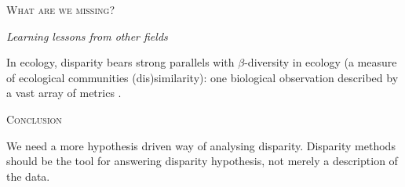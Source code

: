 \documentclass[12pt,letterpaper]{article}
\renewcommand{\section}[1]{%
\bigskip
\begin{center}
\begin{Large}
\normalfont\scshape #1
\medskip
\end{Large}
\end{center}}
\renewcommand{\subsection}[1]{%
\bigskip
\begin{center}
\begin{large}
\normalfont\itshape #1
\end{large}
\end{center}}
\begin{document}
\section{What are we missing?}

\subsection{Learning lessons from other fields}
In ecology, disparity bears strong parallels with $\beta$-diversity in ecology (a measure of ecological communities (dis)similarity): one biological observation described by a vast array of metrics \citep{baselga2010partitioning, anderson2011navigating, donohue2016navigating}.

\section{Conclusion}
We need a more hypothesis driven way of analysing disparity.
Disparity methods should be the tool for answering disparity hypothesis, not merely a description of the data.









\end{document}
